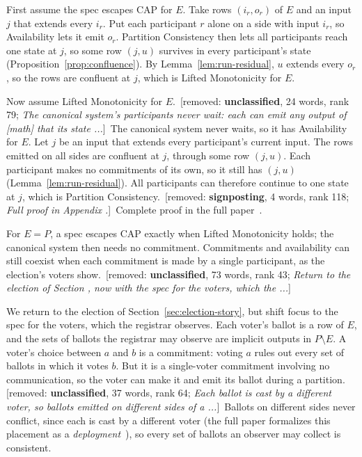 \documentclass[sigconf]{cidr-2027}
\makeatletter
\theoremstyle{remark}
\newcommand{\commitment}{commitment\xspace}
\newcommand{\commitments}{commitments\xspace}
\newcommand{\Commitments}{Commitments\xspace}
\newcommand{\inrel}{extends\xspace}          %
\newcommand{\outrel}{extends\xspace}          %
\newcommand{\fullproof}{Complete proof in the full paper~\cite{hellerstein2026completecalmfull}.}
\newif\ifshowrv \showrvfalse
\newcommand{\rv}[1]{\ifshowrv\textsuperscript{\textcolor{magenta}{\textbf{R#1}}}\fi}
\renewenvironment{proof}[1][\proofname]{\par
  \pushQED{\qed}\normalfont\topsep2\p@\relax
  \trivlist\item[\@proofindent\hskip\labelsep{\@proofnamefont #1\@addpunct{.}}]\ignorespaces
}{\popQED\endtrivlist\@endpefalse}
\newcommand{\removednote}[1]{{\color{cutred}\footnotesize\,[removed: #1]\,}}
\makeatother
\begin{document}
\begin{proof}[Proof sketch]
First assume the spec escapes CAP for $E$. \textcolor{newblue}{Take rows $(i_r,o_r)$ of $E$ and
an input $j$ that \inrel every $i_r$.} \textcolor{newblue}{Put each participant $r$ alone on a side
with input $i_r$, so Availability lets it emit $o_r$.} \textcolor{newblue}{Partition Consistency
then lets all participants reach one state at $j$, so some row $(j,u)$ survives
in every participant's state (Proposition~\ref{prop:confluence}).} By
Lemma~\ref{lem:run-residual}, $u$ \outrel every $o_r$, so the rows are
confluent at $j$, which is Lifted Monotonicity for $E$.

Now assume Lifted Monotonicity for $E$. \removednote{\textbf{unclassified}, 24 words, rank 79; \textit{The canonical system's participants never wait: each can emit any output of [math] that its state ...}} \textcolor{newblue}{The canonical system never waits, so
it has Availability for $E$.} Let $j$ be an input that \inrel every
participant's current input. \textcolor{newblue}{The rows emitted on all sides are confluent at
$j$, through some row $(j,u)$.} \textcolor{newblue}{Each participant makes no \commitments of its own, so it
still has $(j,u)$ (Lemma~\ref{lem:run-residual}).} All participants can
therefore continue to one state at $j$, which is Partition Consistency. \removednote{\textbf{signposting}, 4 words, rank 118; \textit{Full proof in Appendix .}} \textcolor{newblue}{\fullproof}
\end{proof}

For $E=P$, a spec escapes CAP exactly when Lifted Monotonicity holds; the canonical system then needs no \commitment. \textcolor{newblue}{\Commitments and availability can still coexist when each \commitment is made by a single participant, as the election's voters show.} \removednote{\textbf{unclassified}, 73 words, rank 43; \textit{Return to the election of Section , now with the spec for the voters, which the ...}}

\textcolor{newblue}{We return to the election of Section~\ref{sec:election-story}, but shift focus to the spec
for the voters, which the registrar observes.\rv{11}  Each
voter's ballot is a row of $E$, and the sets of ballots the registrar may
observe are implicit outputs in $P\setminus E$.} \textcolor{newblue}{A voter's choice between $a$
and $b$ is a \commitment: voting $a$ rules out every set of ballots in which it
votes $b$.} \textcolor{newblue}{But it is a single-voter \commitment involving no communication, so
the voter can make it and emit its ballot during a partition.} \removednote{\textbf{unclassified}, 37 words, rank 64; \textit{Each ballot is cast by a different voter, so ballots emitted on different sides of a ...}} \textcolor{newblue}{Ballots on
different sides never conflict, since each is cast by a different voter (the
full paper formalizes this placement as a \emph{deployment}~\cite{hellerstein2026completecalmfull}\rv{2}), so every set of ballots an observer may collect is consistent.}
\end{document}
